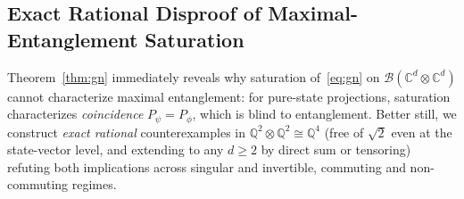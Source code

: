 \documentclass[11pt,a4paper]{article}
\theoremstyle{plain}
\theoremstyle{definition}
\newcommand{\C}{\mathbb{C}}
\newcommand{\Q}{\mathbb{Q}}
\newcommand{\cB}{\mathcal{B}}
\begin{document}
\subsection{Exact Rational Disproof of Maximal-Entanglement Saturation}

Theorem~\ref{thm:gn} immediately reveals why saturation of~\eqref{eq:gn} on $\cB(\C^d \otimes \C^d)$ cannot characterize maximal entanglement: for pure-state projections, saturation characterizes \emph{coincidence} $P_\psi = P_\phi$, which is blind to entanglement. Better still, we construct \emph{exact rational} counterexamples in $\Q^2 \otimes \Q^2 \cong \Q^4$ (free of $\sqrt{2}$ even at the state-vector level, and extending to any $d \ge 2$ by direct sum or tensoring) refuting both implications across singular and invertible, commuting and non-commuting regimes.
\end{document}
